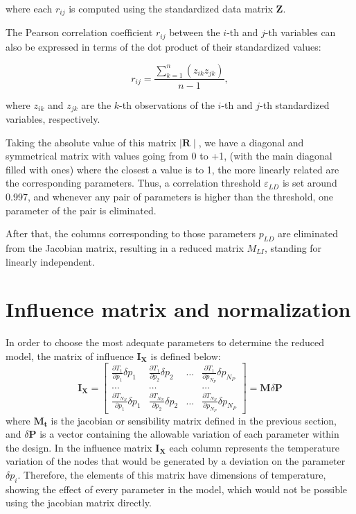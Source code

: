 where each \( r_{ij} \) is computed using the standardized data matrix \( \mathbf{Z} \).

The Pearson correlation coefficient \( r_{ij} \) between the \( i \)-th and \( j \)-th variables can also be expressed in terms of the dot product of their standardized values:

\[
r_{ij} = \frac{\sum_{k=1}^{n} (z_{ik} z_{jk})}{n-1},
\]

where \( z_{ik} \) and \( z_{jk} \) are the \( k \)-th observations of the \( i \)-th and \( j \)-th standardized variables, respectively.

Taking the absolute value of this matrix $\mid \mathbf{R}\mid$, we have a diagonal and symmetrical matrix with values going from 0 to +1, (with the main diagonal filled with ones) where the closest a value is to 1, the more linearly related are the corresponding parameters. Thus, a correlation threshold $\varepsilon_{LD}$ is set around 0.997, and whenever any pair of parameters is higher than the threshold, one parameter of the pair is eliminated.  

After that, the columns corresponding to those parameters $p_{LD}$ are eliminated from the Jacobian matrix, resulting in a reduced matrix $M_{LI}$, standing for linearly independent.

\section{Influence matrix and normalization}\label{s:infmat}

 In order to choose the most adequate parameters to determine the reduced model, the matrix of influence $\mathbf{I}_{\mathbf{X}}$ is defined below:
\begin{equation}
\mathbf{I}_{\mathbf{X}}=\left[\begin{array}{cccc}
\frac{\partial T_1}{\partial p_1} \delta p_1 & \frac{\partial T_1}{\partial p_2} \delta p_2 & \ldots & \frac{\partial T_1}{\partial p_{N_P}} \delta p_{N_P} \\
\ldots & \ldots & & \ldots \\
\frac{\partial T_{N_N}}{\partial p_1} \delta p_1 & \frac{\partial T_{N_N}}{\partial p_2} \delta p_2 & \ldots & \frac{\partial T_{N_N}}{\partial p_{N_P}} \delta p_{N_P}
\end{array}\right]=\mathbf{M} \delta \boldsymbol{P}
\end{equation}
where $\mathbf{M_t}$ is the jacobian or sensibility matrix defined in the previous section, and $ \delta \boldsymbol{P}$ is a vector containing the allowable variation of each parameter within the design. In the influence matrix $\mathbf{I}_{\mathbf{X}}$ each column represents the temperature variation of the nodes that would be generated by a deviation on the parameter $ \delta p_i$. Therefore, the elements of this matrix have dimensions of temperature, showing the effect of every parameter in the model, which would not be possible using the jacobian matrix directly.


